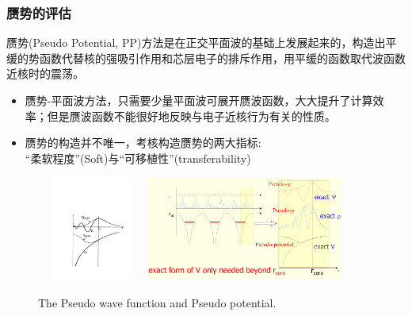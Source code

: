 {\frame
{
\frametitle{赝势的评估}
赝势(\textrm{Pseudo Potential, PP})方法是在正交平面波的基础上发展起来的，构造出平缓的势函数代替核的强吸引作用和芯层电子的排斥作用，用平缓的函数取代波函数近核时的震荡。
\begin{itemize}
\setlength{\itemsep}{5pt}
	\item 赝势-平面波方法，只需要少量平面波可展开赝波函数，大大提升了计算效率；但是赝波函数不能很好地反映与电子近核行为有关的性质。
	\item 赝势的构造并不唯一，考核构造赝势的两大指标:~\\“柔软程度”\textrm{(Soft)}与“可移植性”\textrm{(transferability)}
\end{itemize}
\begin{figure}[h!]
\centering
\vspace*{-0.10in}
\includegraphics[height=1.35in,width=1.40in,viewport=154 100 562 508,clip]{Figures/Pseudo.pdf}
\includegraphics[height=1.35in,width=2.55in,viewport=1 1 980 500,clip]{Figures/Pseudo-2.png}
\caption{\tiny \textrm{The Pseudo wave function and Pseudo potential.}}%
\label{Pseudo_Potential-Wave}
\end{figure}
}

}
